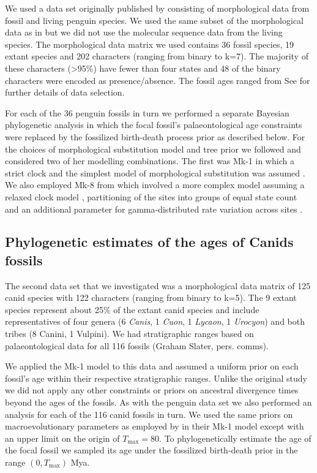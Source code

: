 \documentclass[11pt]{article}
\newcommand{\Mstrict}{{Mk-1}}
\newcommand{\Mrelaxed}{{Mk-8}}
\newcommand{\ncanidfossils}{{116}}
\begin{document}
We used a data set originally published by \cite{ksepka2012} consisting of morphological data from fossil and living penguin 
species. 
We used the same subset of the morphological data as in \cite{gavryushkina2015bayesian} but we did not use the molecular sequence data from the living species. 
The morphological data matrix we used contains 36 fossil species, 19 extant species and 202 characters (ranging from binary to k=7). 
The majority of these characters (\textgreater 95\%) have fewer than four states and 48 of the binary characters were encoded as presence/absence. 
The fossil ages ranged from 
See \cite{gavryushkina2015bayesian} for further details of data selection.

For each of the 36 penguin fossils in turn we performed a separate Bayesian phylogenetic analysis in which the focal fossil's palaeontological age constraints were replaced by 
the fossilized birth-death process prior as described below.  
For the choices of morphological substitution model and tree prior we followed \cite{gavryushkina2015bayesian} and considered two of her modelling combinations. 
The first was \Mstrict{} in which a strict clock and the simplest model of morphological substitution was assumed \cite{Lewis2001}.
We also employed \Mrelaxed{} from \cite{gavryushkina2015bayesian} which involved a more complex model assuming a relaxed clock model \cite{Drummond2006}, partitioning of the sites into groups of equal state count and an additional parameter for gamma-distributed rate variation across sites \cite{yang:1994ma}.

\subsection*{Phylogenetic estimates of the ages of Canids fossils}

The second data set that we investigated was a morphological data matrix of 125 canid species \cite[9 extant and \ncanidfossils{} fossil;][]{Slater2015} with 122 characters (ranging from binary to k=5).
The 9 extant species represent about 25\% of the extant canid species and include representatives of four genera (6 {\em Canis}, 1 {\em Cuon}, 1 {\em Lycaon}, 1 {\em Urocyon}) and both tribes (8 Canini, 1 Vulpini). 
We had stratigraphic ranges based on palaeontological data for all \ncanidfossils{} fossils (Graham Slater, pers. comms). 

We applied the \Mstrict{} model to this data and assumed a uniform prior on each fossil's age within their respective stratigraphic ranges. Unlike the original study \cite{Slater2015} we did not apply any other constraints or priors on ancestral divergence times beyond the ages of the fossils. 
As with the penguin data set we also performed an analysis for each of the \ncanidfossils{} canid fossils in turn. We used the same priors on macroevolutionary parameters as employed by \cite{gavryushkina2015bayesian} in their \Mstrict{} model except with an upper limit on the origin of $T_\text{max} = 80$. To phylogenetically estimate the age of the focal fossil we sampled its age under the fossilized birth-death prior in the range $(0,T_\text{max})$ Mya.
\end{document}
